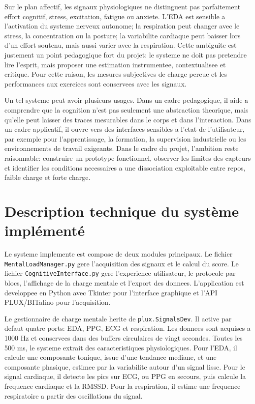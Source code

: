\documentclass[runningheads]{llncs}
\begin{document}
Sur le plan affectif, les signaux physiologiques ne distinguent pas parfaitement effort cognitif, stress, excitation, fatigue ou anxiete. L'EDA est sensible a l'activation du systeme nerveux autonome; la respiration peut changer avec le stress, la concentration ou la posture; la variabilite cardiaque peut baisser lors d'un effort soutenu, mais aussi varier avec la respiration. Cette ambiguite est justement un point pedagogique fort du projet: le systeme ne doit pas pretendre lire l'esprit, mais proposer une estimation instrumentee, contextualisee et critique. Pour cette raison, les mesures subjectives de charge percue et les performances aux exercices sont conservees avec les signaux.

Un tel systeme peut avoir plusieurs usages. Dans un cadre pedagogique, il aide a comprendre que la cognition n'est pas seulement une abstraction theorique, mais qu'elle peut laisser des traces mesurables dans le corps et dans l'interaction. Dans un cadre applicatif, il ouvre vers des interfaces sensibles a l'etat de l'utilisateur, par exemple pour l'apprentissage, la formation, la supervision industrielle ou les environnements de travail exigeants. Dans le cadre du projet, l'ambition reste raisonnable: construire un prototype fonctionnel, observer les limites des capteurs et identifier les conditions necessaires a une dissociation exploitable entre repos, faible charge et forte charge.

\section{Description technique du système implémenté}

Le systeme implemente est compose de deux modules principaux. Le fichier \texttt{MentalLoadManager.py} gere l'acquisition des signaux et le calcul du score. Le fichier \texttt{CognitiveInterface.py} gere l'experience utilisateur, le protocole par blocs, l'affichage de la charge mentale et l'export des donnees. L'application est developpee en Python avec Tkinter pour l'interface graphique et l'API PLUX/BITalino pour l'acquisition.

Le gestionnaire de charge mentale herite de \texttt{plux.SignalsDev}. Il active par defaut quatre ports: EDA, PPG, ECG et respiration. Les donnees sont acquises a 1000 Hz et conservees dans des buffers circulaires de vingt secondes. Toutes les 500 ms, le systeme extrait des caracteristiques physiologiques. Pour l'EDA, il calcule une composante tonique, issue d'une tendance mediane, et une composante phasique, estimee par la variabilite autour d'un signal lisse. Pour le signal cardiaque, il detecte les pics sur ECG, ou PPG en secours, puis calcule la frequence cardiaque et la RMSSD. Pour la respiration, il estime une frequence respiratoire a partir des oscillations du signal.
\end{document}
